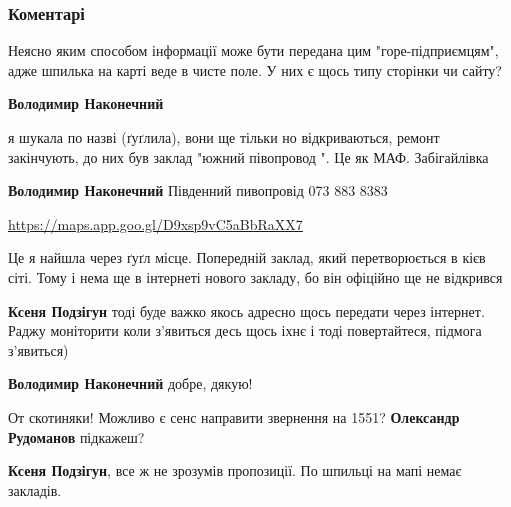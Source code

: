 
 
 
 
 
\subsubsection{Коментарі}
\label{sec:01_10_2021.fb.fb_group.ukyiv.1.kiev_city_kafe.cmt}

\begin{itemize} %

Неясно яким способом інформації може бути передана цим "горе-підприємцям", адже
шпилька на карті веде в чисте поле. У них є щось типу сторінки чи сайту?

\begin{itemize} %
\textbf{Володимир Наконечний} 

я шукала по назві (ґуґлила), вони ще тільки но відкриваються, ремонт
закінчують, до них був заклад "южний півопровод ". Це як МАФ. Забігайлівка

\textbf{Володимир Наконечний}
Південний пивопровід
073 883 8383\par
\url{https://maps.app.goo.gl/D9xsp9vC5aBbRaXX7}

Це я найшла через ґуґл місце. Попередній заклад, який перетворюється в кієв
сіті. Тому і нема ще в інтернеті нового закладу, бо він офіційно ще не
відкрився

\begin{itemize} %
\textbf{Ксеня Подзігун} тоді буде важко якось адресно щось передати через інтернет. Раджу моніторити коли з'явиться десь щось іхнє і тоді повертайтеся, підмога з'явиться)

\textbf{Володимир Наконечний} добре, дякую!
\end{itemize} %

От скотиняки! Можливо є сенс направити звернення на 1551? \textbf{Олександр Рудоманов} підкажеш?

\end{itemize} %

\textbf{Ксеня Подзігун}, все ж не зрозумів пропозиції. По шпильці на мапі немає закладів.


\end{itemize}
